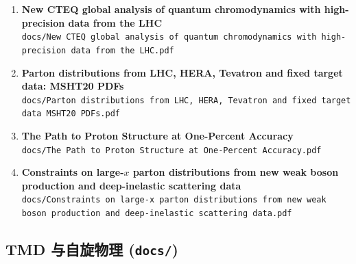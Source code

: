 \documentclass[12pt,a4paper]{ctexart}
\begin{document}
\begin{enumerate}
    \item \textbf{New CTEQ global analysis of quantum chromodynamics with high-precision data from the LHC} \\
    \texttt{docs/New CTEQ global analysis of quantum chromodynamics with high-precision data from the LHC.pdf}

    \item \textbf{Parton distributions from LHC, HERA, Tevatron and fixed target data: MSHT20 PDFs} \\
    \texttt{docs/Parton distributions from LHC, HERA, Tevatron and fixed target data MSHT20 PDFs.pdf}

    \item \textbf{The Path to Proton Structure at One-Percent Accuracy} \\
    \texttt{docs/The Path to Proton Structure at One-Percent Accuracy.pdf}

    \item \textbf{Constraints on large-$x$ parton distributions from new weak boson production and deep-inelastic scattering data} \\
    \texttt{docs/Constraints on large-x parton distributions from new weak boson production and deep-inelastic scattering data.pdf}
\end{enumerate}

\subsection{TMD 与自旋物理 (\texttt{docs/})}
\end{document}
